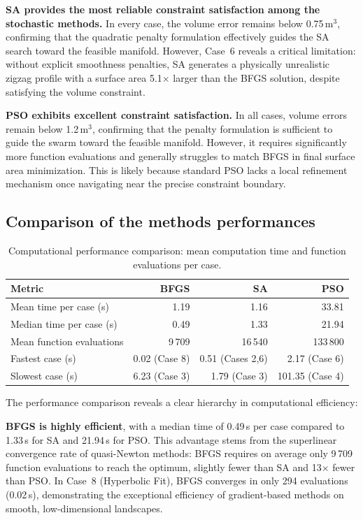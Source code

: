 \textbf{SA provides the most reliable constraint satisfaction among the stochastic methods.} In every case, the volume error remains below 0.75\,m$^3$, confirming that the quadratic penalty formulation effectively guides the SA search toward the feasible manifold. However, Case~6 reveals a critical limitation: without explicit smoothness penalties, SA generates a physically unrealistic zigzag profile with a surface area 5.1$\times$ larger than the BFGS solution, despite satisfying the volume constraint.

\textbf{PSO exhibits excellent constraint satisfaction.} In all cases, volume errors remain below 1.2\,m$^3$, confirming that the penalty formulation is sufficient to guide the swarm toward the feasible manifold. However, it requires significantly more function evaluations and generally struggles to match BFGS in final surface area minimization. This is likely because standard PSO lacks a local refinement mechanism once navigating near the precise constraint boundary.

\subsection{Comparison of the methods performances}

\begin{table}[H]
\centering
\caption{Computational performance comparison: mean computation time and function evaluations per case.}
\label{tab:perf_comparison}
\begin{tabular}{l r r r}
\hline
\textbf{Metric} & \textbf{BFGS} & \textbf{SA} & \textbf{PSO} \\
\hline
Mean time per case (s) & 1.19 & 1.16 & 33.81 \\
Median time per case (s) & 0.49 & 1.33 & 21.94 \\
Mean function evaluations & 9\,709 & 16\,540 & 133\,800 \\
Fastest case (s) & 0.02 (Case 8) & 0.51 (Cases 2,6) & 2.17 (Case 6) \\
Slowest case (s) & 6.23 (Case 3) & 1.79 (Case 3) & 101.35 (Case 4) \\
\hline
\end{tabular}
\end{table}

The performance comparison reveals a clear hierarchy in computational efficiency:

\textbf{BFGS is highly efficient}, with a median time of 0.49\,s per case compared to 1.33\,s for SA and 21.94\,s for PSO. This advantage stems from the superlinear convergence rate of quasi-Newton methods: BFGS requires on average only 9\,709 function evaluations to reach the optimum, slightly fewer than SA and 13$\times$ fewer than PSO. In Case~8 (Hyperbolic Fit), BFGS converges in only 294 evaluations (0.02\,s), demonstrating the exceptional efficiency of gradient-based methods on smooth, low-dimensional landscapes.

